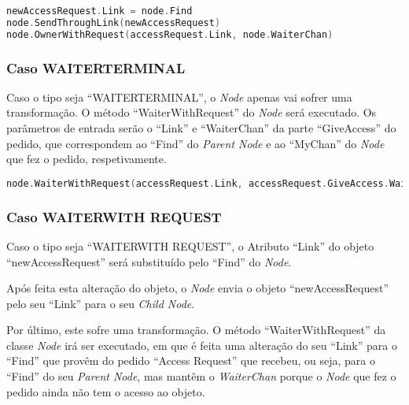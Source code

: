 \begin{lstlisting}[caption={Comportamento do \emph{Node} tipo \emph{Owner Terminal} caso receba um pedido \emph{Access Request} no \emph{Channel ``Find''}},language=Go]
newAccessRequest.Link = node.Find
node.SendThroughLink(newAccessRequest)
node.OwnerWithRequest(accessRequest.Link, node.WaiterChan)
\end{lstlisting}


\subsubsection*{Caso WAITER\textunderscore TERMINAL}
Caso o tipo seja ``WAITER\textunderscore TERMINAL'', o \emph{Node} apenas vai sofrer uma transformação. O método ``WaiterWithRequest'' do \emph{Node} será executado.
Os parâmetros de entrada serão o ``Link'' e ``WaiterChan'' da parte ``GiveAccess'' do pedido, que correspondem ao ``Find'' do \emph{Parent Node} e ao ``MyChan'' do \emph{Node} que fez o pedido, respetivamente.

\begin{lstlisting}[caption={Comportamento do \emph{Node} tipo \emph{Owner Terminal} caso receba um pedido \emph{Access Request} no \emph{Channel ``Find''}},language=Go]
node.WaiterWithRequest(accessRequest.Link, accessRequest.GiveAccess.WaiterChan)
\end{lstlisting}


\subsubsection*{Caso WAITER\textunderscore WITH \textunderscore REQUEST}	
Caso o tipo seja ``WAITER\textunderscore WITH \textunderscore REQUEST'', o Atributo ``Link'' do objeto ``newAccessRequest'' será substituído pelo ``Find'' do \emph{Node}.

Após feita esta alteração do objeto, o \emph{Node} envia o objeto ``newAccessRequest'' pelo seu ``Link'' para o seu \emph{Child Node}.

Por último, este sofre uma transformação. O método ``WaiterWithRequest'' da classe \emph{Node} irá ser executado, 
em que é feita uma alteração do seu ``Link'' para o ``Find'' que provêm do pedido ``Access Request'' que recebeu, ou seja, para o ``Find'' do seu \emph{Parent Node}, 
mas mantêm o \emph{WaiterChan} porque o \emph{Node} que fez o pedido ainda não tem o acesso ao objeto.


